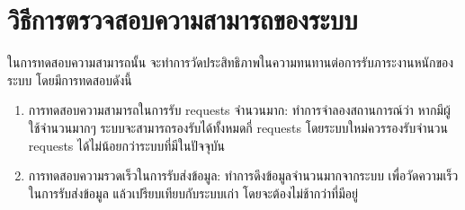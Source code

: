 \section{วิธีการตรวจสอบความสามารถของระบบ}
ในการทดสอบความสามารถนั้น จะทำการวัดประสิทธิภาพในความทนทานต่อการรับภาระงานหนักของระบบ โดยมีการทดสอบดังนี้
\begin{enumerate}
    \item การทดสอบความสามารถในการรับ requests จำนวนมาก: ทำการจำลองสถานการณ์ว่า หากมีผู้ใช้จำนวนมากๆ ระบบจะสามารถรองรับได้ทั้งหมดกี่ 
    requests โดยระบบใหม่ควรรองรับจำนวน requests ได้ไม่น้อยกว่าระบบที่มีในปัจจุบัน
    \item การทดสอบความรวดเร็วในการรับส่งข้อมูล: ทำการดึงข้อมูลจำนวนมากจากระบบ เพื่อวัดความเร็วในการรับส่งข้อมูล แล้วเปรียบเทียบกับระบบเก่า โดยจะต้องไม่ช้ากว่าที่มีอยู่
\end{enumerate}
